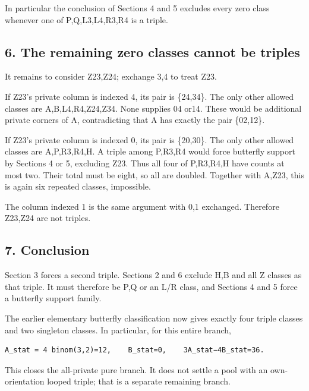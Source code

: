 \documentclass[
  10pt,
]{article}
\begin{document}
In particular the conclusion of Sections 4 and 5 excludes every zero
class whenever one of P,Q,L3,L4,R3,R4 is a triple.

\hypertarget{the-remaining-zero-classes-cannot-be-triples}{%
\subsection*{6. The remaining zero classes cannot be
triples}\label{the-remaining-zero-classes-cannot-be-triples}}

It remains to consider Z23,Z24; exchange 3,4 to treat Z23.

If Z23's private column is indexed 4, its pair is \{24,34\}. The only
other allowed classes are A,B,L4,R4,Z24,Z34. None supplies 04 or14.
These would be additional private corners of A, contradicting that A has
exactly the pair \{02,12\}.

If Z23's private column is indexed 0, its pair is \{20,30\}. The only
other allowed classes are A,P,R3,R4,H. A triple among P,R3,R4 would
force butterfly support by Sections 4 or 5, excluding Z23. Thus all four
of P,R3,R4,H have counts at most two. Their total must be eight, so all
are doubled. Together with A,Z23, this is again six repeated classes,
impossible.

The column indexed 1 is the same argument with 0,1 exchanged. Therefore
Z23,Z24 are not triples.

\hypertarget{conclusion}{%
\subsection*{7. Conclusion}\label{conclusion}}

Section 3 forces a second triple. Sections 2 and 6 exclude H,B and all Z
classes as that triple. It must therefore be P,Q or an L/R class, and
Sections 4 and 5 force a butterfly support family.

The earlier elementary butterfly classification now gives exactly four
triple classes and two singleton classes. In particular, for this entire
branch,

\begin{verbatim}
A_stat = 4 binom(3,2)=12,    B_stat=0,    3A_stat−4B_stat=36.
\end{verbatim}

This closes the all-private pure branch. It does not settle a pool with
an own-orientation looped triple; that is a separate remaining branch.
\end{document}
